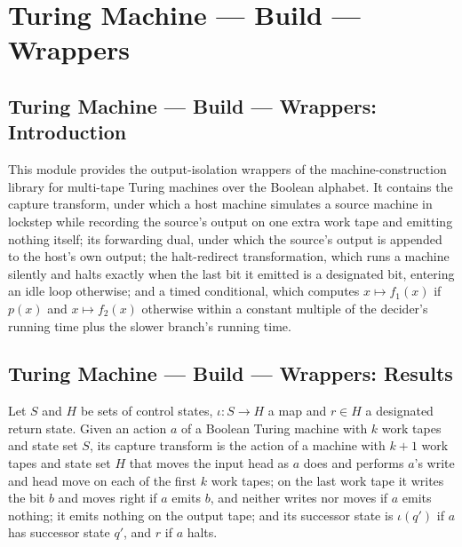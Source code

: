 \section{Turing Machine --- Build --- Wrappers}
\subsection*{Turing Machine --- Build --- Wrappers: Introduction}

This module provides the output-isolation wrappers of the machine-construction library
for multi-tape Turing machines over the Boolean alphabet. It contains the capture
transform, under which a host machine simulates a source machine in lockstep while
recording the source's output on one extra work tape and emitting nothing itself; its
forwarding dual, under which the source's output is appended to the host's own output;
the halt-redirect transformation, which runs a machine silently and halts exactly when
the last bit it emitted is a designated bit, entering an idle loop otherwise; and a timed
conditional, which computes $x \mapsto f_1(x)$ if $p(x)$ and $x \mapsto f_2(x)$ otherwise
within a constant multiple of the decider's running time plus the slower branch's
running time.

\subsection*{Turing Machine --- Build --- Wrappers: Results}

\begin{definition}
\label{Turing.captureAction}
\leanok
{}
Let $S$ and $H$ be sets of control states, $\iota : S \to H$ a map and $r \in H$ a
designated return state. Given an action $a$ of a Boolean Turing machine with $k$ work
tapes and state set $S$, its capture transform is the action of a machine with $k+1$
work tapes and state set $H$ that moves the input head as $a$ does and performs $a$'s
write and head move on each of the first $k$ work tapes; on the last work tape it writes
the bit $b$ and moves right if $a$ emits $b$, and neither writes nor moves if $a$ emits
nothing; it emits nothing on the output tape; and its successor state is $\iota(q')$ if
$a$ has successor state $q'$, and $r$ if $a$ halts.
\end{definition}

